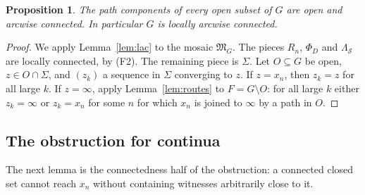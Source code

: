 \documentclass[11pt]{amsart}
\newtheorem{proposition}[theorem]{Proposition}
\theoremstyle{definition}
\theoremstyle{remark}
\newcommand{\cS}{\mathcal{S}}
\newcommand{\fM}{\mathfrak{M}}
\numberwithin{equation}{section}
\begin{document}
\begin{proposition}\label{prop:Glac}
The path components of every open subset of $G$ are open and arcwise connected. In particular $G$ is locally arcwise connected.
\end{proposition}
\begin{proof}
We apply Lemma~\ref{lem:lac} to the mosaic $\fM_G$. The pieces $R_n$, $\Phi_D$ and $\Lambda_\cS$ are locally connected, by (F2). The remaining piece is $\Sigma$. Let $O\subseteq G$ be open, $z\in O\cap\Sigma$, and $(z_k)$ a sequence in $\Sigma$ converging to $z$. If $z=x_n$, then $z_k=z$ for all large $k$. If $z=\infty$, apply Lemma~\ref{lem:routes} to $F=G\setminus O$: for all large $k$ either $z_k=\infty$ or $z_k=x_n$ for some $n$ for which $x_n$ is joined to $\infty$ by a path in $O$.
\end{proof}

\subsection{The obstruction for continua}
The next lemma is the connectedness half of the obstruction: a connected closed set cannot reach $x_n$ without containing witnesses arbitrarily close to it.
\end{document}
